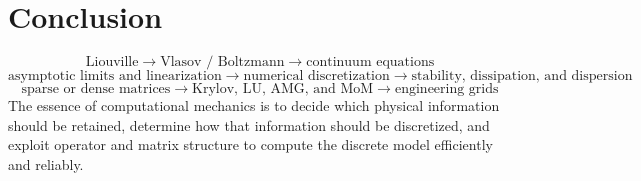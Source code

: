 \documentclass[11pt,openany]{book}
\begin{document}
\chapter*{Conclusion}
\[
\boxed{\text{Liouville}\to\text{Vlasov / Boltzmann}\to\text{continuum equations}}
\]
\[
\boxed{\text{asymptotic limits and linearization}\to\text{numerical discretization}\to\text{stability, dissipation, and dispersion}}
\]
\[
\boxed{\text{sparse or dense matrices}\to\text{Krylov, LU, AMG, and MoM}\to\text{engineering grids}}
\]
The essence of computational mechanics is to decide which physical information should be retained, determine how that information should be discretized, and exploit operator and matrix structure to compute the discrete model efficiently and reliably.
\end{document}
